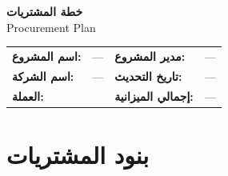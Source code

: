 \documentclass[11pt,a4paper]{article}
\begin{document}
\begin{center}
{\LARGE\bfseries خطة المشتريات}\\[0.3em]
{\large Procurement Plan}\\[1em]
\end{center}

\begin{table}[H]
\centering
\renewcommand{\arraystretch}{1.4}
\begin{tabularx}{\textwidth}{L{3.5cm} X L{3.5cm} X}
\toprule
\textbf{اسم المشروع:} & --- & \textbf{مدير المشروع:} & --- \\
\textbf{اسم الشركة:} & --- & \textbf{تاريخ التحديث:} & --- \\
\textbf{العملة:} &  & \textbf{إجمالي الميزانية:} & --- \\
\bottomrule
\end{tabularx}
\end{table}

\vspace{1em}

\section{بنود المشتريات}
\label{sec:procurement}
\end{document}
